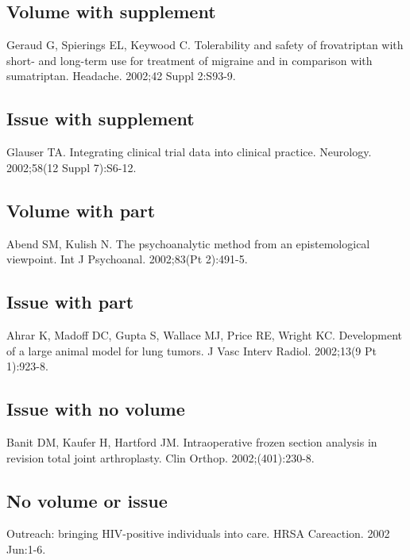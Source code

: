 \documentclass[a4paper,10pt]{article}
\begin{document}
\subsection{Volume with supplement}

Geraud G, Spierings EL, Keywood C. Tolerability and safety of frovatriptan with short- and long-term use for treatment of migraine and in comparison with sumatriptan. Headache. 2002;42 Suppl 2:S93-9.\cite{geraud.spierings.ea:tolerability}

\subsection{Issue with supplement}

Glauser TA. Integrating clinical trial data into clinical practice. Neurology. 2002;58(12 Suppl 7):S6-12.\cite{glauser:integrating}

\subsection{Volume with part}

Abend SM, Kulish N. The psychoanalytic method from an epistemological viewpoint. Int J Psychoanal. 2002;83(Pt 2):491-5.\cite{abend.kulish:psychoanalytic}

\subsection{Issue with part}

Ahrar K, Madoff DC, Gupta S, Wallace MJ, Price RE, Wright KC. Development of a large animal model for lung tumors. J Vasc Interv Radiol. 2002;13(9 Pt 1):923-8.\cite{ahrar.madoff.ea:development}

\subsection{Issue with no volume}

Banit DM, Kaufer H, Hartford JM. Intraoperative frozen section analysis in revision total joint arthroplasty. Clin Orthop. 2002;(401):230-8.\cite{banit.kaufer.ea:intraoperative}

\subsection{No volume or issue}

Outreach: bringing HIV-positive individuals into care. HRSA Careaction. 2002 Jun:1-6.\cite{outreach}
\end{document}

